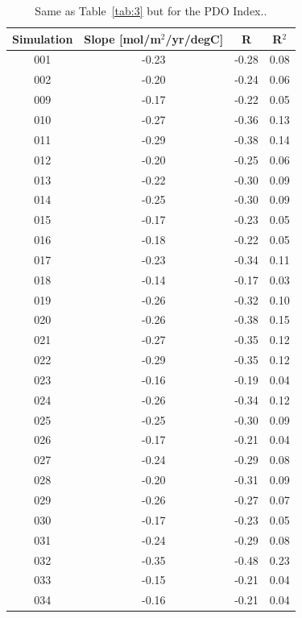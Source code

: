 \documentclass[12pt]{article}
\begin{document}
\newpage
\begin{table}[p!]
	\centering
	\caption{Same as Table~\ref{tab:3} but for the PDO Index..}
	\begin{tabular}{c | c c c}
		\toprule
		\textbf{Simulation} &  \textbf{Slope} [mol/m$^{2}$/yr/degC] &  \textbf{R} &  \textbf{R$^{2}$} \\
		\midrule
		001 &  -0.23 &    -0.28 &       0.08 \\
		002 &  -0.20 &    -0.24 &       0.06 \\
		009 &  -0.17 &    -0.22 &       0.05 \\
		010 &  -0.27 &    -0.36 &       0.13 \\
		011 &  -0.29 &    -0.38 &       0.14 \\
		012 &  -0.20 &    -0.25 &       0.06 \\
		013 &  -0.22 &    -0.30 &       0.09 \\
		014 &  -0.25 &    -0.30 &       0.09 \\
		015 &  -0.17 &    -0.23 &       0.05 \\
		016 &  -0.18 &    -0.22 &       0.05 \\
		017 &  -0.23 &    -0.34 &       0.11 \\
		018 &  -0.14 &    -0.17 &       0.03 \\
		019 &  -0.26 &    -0.32 &       0.10 \\
		020 &  -0.26 &    -0.38 &       0.15 \\
		021 &  -0.27 &    -0.35 &       0.12 \\
		022 &  -0.29 &    -0.35 &       0.12 \\
		023 &  -0.16 &    -0.19 &       0.04 \\
		024 &  -0.26 &    -0.34 &       0.12 \\
		025 &  -0.25 &    -0.30 &       0.09 \\
		026 &  -0.17 &    -0.21 &       0.04 \\
		027 &  -0.24 &    -0.29 &       0.08 \\
		028 &  -0.20 &    -0.31 &       0.09 \\
		029 &  -0.26 &    -0.27 &       0.07 \\
		030 &  -0.17 &    -0.23 &       0.05 \\
		031 &  -0.24 &    -0.29 &       0.08 \\
		032 &  -0.35 &    -0.48 &       0.23 \\
		033 &  -0.15 &    -0.21 &       0.04 \\
		034 &  -0.16 &    -0.21 &       0.04 \\

\end{tabular}
\end{table}
\end{document}
